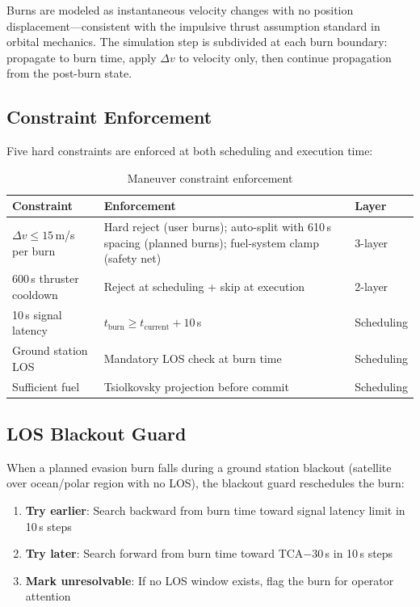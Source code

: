 \documentclass[11pt,a4paper]{article}
\begin{document}
Burns are modeled as instantaneous velocity changes with no position
displacement---consistent with the impulsive thrust assumption standard in
orbital mechanics. The simulation step is subdivided at each burn boundary:
propagate to burn time, apply $\Delta v$ to velocity only, then continue
propagation from the post-burn state.

\subsection{Constraint Enforcement}

Five hard constraints are enforced at both scheduling and execution time:

\begin{table}[H]
\centering
\caption{Maneuver constraint enforcement}
\begin{tabular}{@{}lp{5cm}l@{}}
\toprule
\textbf{Constraint} & \textbf{Enforcement} & \textbf{Layer} \\
\midrule
$\Delta v \leq 15$\,m/s per burn & Hard reject (user burns); auto-split with 610\,s spacing (planned burns); fuel-system clamp (safety net) & 3-layer \\
600\,s thruster cooldown & Reject at scheduling + skip at execution & 2-layer \\
10\,s signal latency & $t_\text{burn} \geq t_\text{current} + 10$\,s & Scheduling \\
Ground station LOS & Mandatory LOS check at burn time & Scheduling \\
Sufficient fuel & Tsiolkovsky projection before commit & Scheduling \\
\bottomrule
\end{tabular}
\end{table}

\subsection{LOS Blackout Guard}

When a planned evasion burn falls during a ground station blackout (satellite
over ocean/polar region with no LOS), the blackout guard reschedules
the burn:

\begin{enumerate}[nosep]
  \item \textbf{Try earlier}: Search backward from burn time toward signal
        latency limit in 10\,s steps
  \item \textbf{Try later}: Search forward from burn time toward TCA$-$30\,s
        in 10\,s steps
  \item \textbf{Mark unresolvable}: If no LOS window exists, flag the burn
        for operator attention
\end{enumerate}
\end{document}
